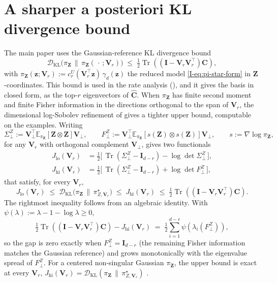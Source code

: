 \documentclass[supplement,review,hidelinks,onefignum,onetabnum]{siamart251216}
\newcommand{\EE}{\mathbb{E}}
\newcommand{\tr}{\operatorname{Tr}}
\newcommand{\DKL}{\mathcal{D}_{\mathrm{KL}}}
\newcommand{\gauss}{\gamma}
\newcommand{\mC}{\bm{C}}
\newcommand{\hmC}{\widehat{\bm{C}}}
\newcommand{\mV}{\bm{V}}
\newcommand{\mI}{\bm{I}}
\newcommand{\vz}{\bm{z}}
\newcommand{\vZ}{\bm{Z}}
\begin{document}
\section{A sharper a posteriori KL divergence bound}
\label{sm:sharper-bound}

The main paper uses the Gaussian-reference KL divergence bound
\begin{equation}
  \DKL\bigl(\pi_{\vZ}\,\|\,\pi_{\vZ}(\,\cdot\,;\mV_r)\bigr) \;\le\; \tfrac12\tr((\mI-\mV_r\mV_r^\top)\mC),
  \label{eq:sm-trace-bound}
\end{equation}
with $\pi_{\vZ}(\vz;\mV_r) := c_r^{U}(\mV_r^\top\vz)\,\gauss_d(\vz)$ the reduced model \eqref{I-eq:pi-star-form} in $\vZ$-coordinates. This bound is used in the rate analysis (), and it gives the basis in closed form, as the top-$r$ eigenvectors of $\hmC$. When $\pi_{\vZ}$ has finite second moment and finite Fisher information in the directions orthogonal to the span of $\mV_r$, the dimensional log-Sobolev refinement of \cite{LiCuiLiMarzoukZahm2024sharp} gives a tighter upper bound, computable on the examples. Writing
\[
  \Sigma^{Z}_{\perp} := \mV_\perp^\top \EE_{\pi_{\vZ}}[\vZ\otimes \vZ]\mV_\perp,
  \qquad
  F^{Z}_{\perp} := \mV_\perp^\top \EE_{\pi_{\vZ}}[s(\vZ)\otimes s(\vZ)]\mV_\perp,
  \qquad s := \nabla \log \pi_{\vZ},
\]
for any $\mV_r$ with orthogonal complement $\mV_\perp$, \cite{LiCuiLiMarzoukZahm2024sharp} gives two functionals
\begin{align}
  J_{\mathrm{lo}}(\mV_r)
  &= \tfrac12\bigl[\,\tr(\Sigma^Z_\perp - \mI_{d-r}) - \log\det \Sigma^Z_\perp\,\bigr], \nonumber \\
  J_{\mathrm{hi}}(\mV_r)
  &= \tfrac12\bigl[\,\tr(\Sigma^Z_\perp - \mI_{d-r}) + \log\det F^Z_\perp\,\bigr],
  \label{eq:sm-jhi-jlo}
\end{align}
that satisfy, for every $\mV_r$,
\begin{equation}
  J_{\mathrm{lo}}(\mV_r)
  \;\le\;
  \DKL\!\bigl(\pi_{\vZ}\,\|\,\pi^\star_{Z, \mV_r}\bigr)
  \;\le\;
  J_{\mathrm{hi}}(\mV_r)
  \;\le\;
  \tfrac12\tr((\mI-\mV_r\mV_r^\top)\mC).
  \label{eq:sm-jhi-sandwich}
\end{equation}
The rightmost inequality follows from an algebraic identity. With $\psi(\lambda) := \lambda - 1 - \log\lambda \ge 0$,
\begin{equation}
  \tfrac12\tr((\mI-\mV_r\mV_r^\top)\mC) - J_{\mathrm{hi}}(\mV_r)
  \;=\;
  \tfrac12 \sum_{i=1}^{d-r}\psi(\lambda_i(F^Z_\perp)),
  \label{eq:sm-jhi-trace-gap}
\end{equation}
so the gap is zero exactly when $F^Z_\perp = \mI_{d-r}$ (the remaining Fisher information matches the Gaussian reference) and grows monotonically with the eigenvalue spread of $F^Z_\perp$. For a centered non-singular Gaussian $\pi_{\vZ}$, the upper bound is exact at every $\mV_r$, $J_{\mathrm{hi}}(\mV_r) = \DKL(\pi_{\vZ}\,\|\,\pi^\star_{Z,\mV_r})$ \cite{LiCuiLiMarzoukZahm2024sharp}.
\end{document}
